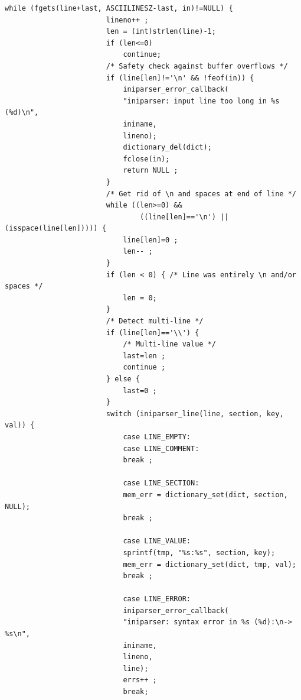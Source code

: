 \documentclass{article}
\begin{document}
\begin{Verbatim}[gobble=8]
                    while (fgets(line+last, ASCIILINESZ-last, in)!=NULL) {
                        lineno++ ;
                        len = (int)strlen(line)-1;
                        if (len<=0)
                            continue;
                        /* Safety check against buffer overflows */
                        if (line[len]!='\n' && !feof(in)) {
                            iniparser_error_callback(
                            "iniparser: input line too long in %s (%d)\n",
                            ininame,
                            lineno);
                            dictionary_del(dict);
                            fclose(in);
                            return NULL ;
                        }
                        /* Get rid of \n and spaces at end of line */
                        while ((len>=0) &&
                                ((line[len]=='\n') || (isspace(line[len])))) {
                            line[len]=0 ;
                            len-- ;
                        }
                        if (len < 0) { /* Line was entirely \n and/or spaces */
                            len = 0;
                        }
                        /* Detect multi-line */
                        if (line[len]=='\\') {
                            /* Multi-line value */
                            last=len ;
                            continue ;
                        } else {
                            last=0 ;
                        }
                        switch (iniparser_line(line, section, key, val)) {
                            case LINE_EMPTY:
                            case LINE_COMMENT:
                            break ;
                
                            case LINE_SECTION:
                            mem_err = dictionary_set(dict, section, NULL);
                            break ;
                
                            case LINE_VALUE:
                            sprintf(tmp, "%s:%s", section, key);
                            mem_err = dictionary_set(dict, tmp, val);
                            break ;
                
                            case LINE_ERROR:
                            iniparser_error_callback(
                            "iniparser: syntax error in %s (%d):\n-> %s\n",
                            ininame,
                            lineno,
                            line);
                            errs++ ;
                            break;
                

\end{Verbatim}
\end{document}
